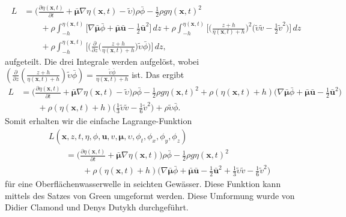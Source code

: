 \begin{align*}
L&=
\biggl(\frac{\partial \eta(\bm{x}, t)}{\partial t}
+
\bar{\bm{\mu}}  \nabla \eta(\bm{x}, t)
-
\widetilde{\upsilon}\biggr)\rho \bar{\phi}
-
\frac{1}{2}\rho g \eta(\bm{x}, t)^2
\\
&\qquad+
\rho\int_{-h}^{\eta(\bm{x}, t)}
\biggl[
\nabla \bar{\bm{\mu}}\bar{\phi} + \bar{\bm{\mu}}\bar{\bm{u}}
- \frac{1}{2} \bar{\bm{u}}^2
\biggr]\, dz
+
\rho\int_{-h}^{\eta(\bm{x}, t)}
\biggl[
\biggl(\frac{z + h}{\eta(\bm{x}, t) + h}\bigr)^2
\biggl(\tilde{\upsilon}\tilde{v} - \frac{1}{2} \tilde{v}^2\biggr)
\biggr]\, dz
\\
&\qquad+
\rho\int_{-h}^{\eta(\bm{x}, t)}
\biggl[
\biggl(\frac{\partial}{\partial z} \biggl(\frac{z + h}{\eta(\bm{x}, t) + h}\biggr)\tilde{\upsilon} \bar{\phi}
\biggr)
\biggr]\, dz,
\end{align*}
aufgeteilt.
Die drei Integrale werden aufgelöst, wobei
$\left(\frac{\partial}{\partial z}
\left(\frac{z + h}{\eta(\bm{x}, t) + h}\right)
\tilde{\upsilon} \bar{\phi}
\right)
=
\frac{\tilde{\upsilon} \bar{\phi}}{\eta(\bm{x}, t) + h}$
ist.
Das ergibt
\begin{align*}
L&=
\biggl(\frac{\partial \eta(\bm{x}, t)}{\partial t}
+
\bar{\bm{\mu}} \nabla \eta(\bm{x}, t)
-
\widetilde{\upsilon}\biggr)\rho \bar{\phi}
-
\frac{1}{2}\rho g \eta(\bm{x}, t)^2
+
\rho(\eta(\bm{x}, t) + h)
\biggl(\nabla \bar{\bm{\mu}}\bar{\phi} + \bar{\bm{\mu}}\bar{\bm{u}}
- \frac{1}{2} \bar{\bm{u}}^2\biggr)
\\
&\qquad
+
\rho(\eta(\bm{x}, t) + h)
\biggl(\frac{1}{3}\tilde{\upsilon}\tilde{v} - \frac{1}{6}\tilde{v}^2 \biggr)
+
\rho\tilde{\upsilon} \bar{\phi}.
\end{align*}
Somit erhalten wir die einfache Lagrange-Funktion
\begin{align*}
&L(\bm{x},z,t,\eta,\phi,\bm{u}, v, \bm{\mu},\upsilon,\phi_t,\phi_x,\phi_y,\phi_z)
\\
&\qquad
=
\biggl(\frac{\partial \eta(\bm{x}, t)}{\partial t}
+
\bar{\bm{\mu}} \nabla \eta(\bm{x}, t)
\biggr)\rho \bar{\phi}
-
\frac{1}{2}\rho g \eta(\bm{x}, t)^2
\\
&\qquad\qquad
+
\rho(\eta(\bm{x}, t) + h)
\biggl(\nabla \bar{\bm{\mu}}\bar{\phi} + \bar{\bm{\mu}}\bar{\bm{u}} - \frac{1}{2} \bar{\bm{u}}^2 + \frac{1}{3} \tilde{\upsilon}\tilde{v} - \frac{1}{6}\tilde{v}^2\biggr)
\end{align*}
für eine Oberflächenwasserwelle in seichten Gewässer.
Diese Funktion kann mittels des Satzes von Green umgeformt werden.
Diese Umformung wurde von Didier Clamond und Denys Dutykh \cite{luke:CLAMOND201225} durchgeführt.
